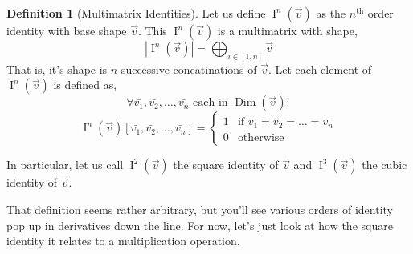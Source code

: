 \documentclass[12pt]{article}
\theoremstyle{definition}
\newtheorem{definition}{Definition}[section]
\theoremstyle{case}
\theoremstyle{ppart}
\DeclareMathOperator{\Dim}{Dim}
\DeclareMathOperator{\Ident}{I}
\begin{document}
\begin{definition}[Multimatrix Identities]
\label{mm_ident}
Let us define $\Ident^n(\vec{v})$ as the $n^{\text{th}}$ order identity with base shape
$\vec{v}$. This $\Ident^n(\vec{v})$ is a multimatrix with shape,
\[ |\Ident^n(\vec{v})| = \bigoplus_{i \in [1, n]} \vec{v} \]
That is, it's shape is $n$ successive concatinations of $\vec{v}$.
Let each element of $\Ident^n(\vec{v})$ is defined as,
\[ \forall \bar{v_1}, \bar{v_2}, \ldots, \bar{v_n} \text{ each in } \Dim(\vec{v}) : \]
\[
 \Ident^n(\vec{v})[\bar{v_1}, \bar{v_2}, \ldots, \bar{v_n}]
 = \left\{
	\begin{array}{ll}
		1 & \mbox{if } \bar{v_1} = \bar{v_2} = \ldots = \bar{v_n} \\
		0 & \mbox{otherwise}
	\end{array}
 \right.
\]

In particular, let us call $\Ident^2(\vec{v})$ the square identity of $\vec{v}$ and
$\Ident^3(\vec{v})$ the cubic identity of $\vec{v}$.
\end{definition}

That definition seems rather arbitrary, but you'll see various orders of identity
pop up in derivatives down the line. For now, let's just look at how the
square identity it relates to a multiplication operation.
\end{document}
